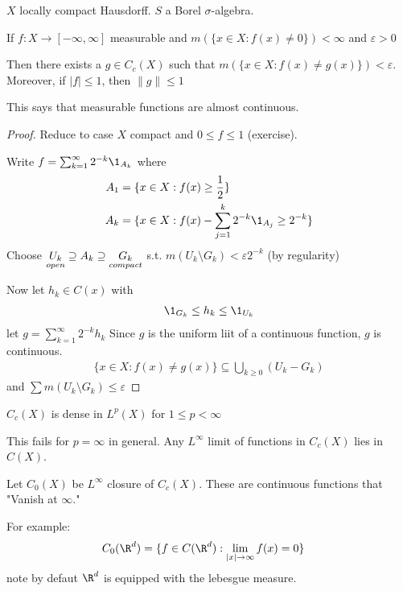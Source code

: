 $X$ locally compact Hausdorff. $S$ a Borel $\sigma$-algebra.

 
 \begin{theorem}[Lusin]
	 If $f: X \to [-\infty, \infty]$  measurable and $m(\{x \in X : f(x) \neq 0 \} ) < \infty$ and  $\varepsilon > 0$

	 Then there exists a $g \in C_{c} (X) $ such that $m( \{ x \in X : f(x) \neq g(x) \} ) < \varepsilon$.
	 Moreover, if $|f| \leq 1$, then $ \|g\| \leq 1$
 \end{theorem}
 
 \begin{remark}
 	This says that measurable functions are almost continuous.
 \end{remark}
 
\begin{proof}
	Reduce to case $X$ compact and $0 \leq f \leq 1$ (exercise).

	Write $f = \sum_{k=1}^{\infty} 2^{-k} \1_{A_{k}}$ where 
	\begin{align*}
		A_{1} &= \{ x \in X : f(x) \geq \frac{1}{2} \} \\
		A_{k} &= \{ x \in X : f(x) - \sum_{j=1}^{k} 2^{-k} \1_{A_{j}} \geq 2^{-k} \}
	\end{align*}
	Choose $\underset{open}{U_{k}} \supseteq A_{k} \supseteq \underset{compact}{G_{k}}$
	s.t. $m(U_{k} \setminus G_{k}) < \varepsilon 2^{-k}$ (by regularity)

	Now let $h_{k} \in C (x)$ with
	\begin{align*}
		\1_{G_{k}} \leq h_{k} \leq \1_{U_{k}}
	\end{align*} 
	let $g = \sum_{k=1}^{\infty} 2^{-k}h_{k}$
	Since $g$ is the uniform liit of a continuous function, $g$ is continuous.
	\begin{align*}
		\{ x \in X : f(x) \neq g(x) \} \subseteq \bigcup_{k \geq 0} ( U_{k} - G_{k} )
	\end{align*} and
	$\sum m( U_{k} \setminus G_{k} ) \leq \varepsilon$
\end{proof}
 
\begin{corollary}
	$C_c (X)$ is dense in $L^{p} (X)$ for $1 \leq p < \infty$
\end{corollary}

\begin{remark}
	This fails for $p = \infty$ in general.
	Any $L^{\infty}$ limit of functions in $C_c (X)$ lies in $C (X)$.
\end{remark}

Let $C_{0} (X)$ be $L^{\infty}$ closure of $C_c (X)$. These are continuous functions that "Vanish at $\infty$."

For example:
\begin{align*}
	C_{0} (\R^d ) &= \{ f\in C (\R^{d}) : \lim_{|x| \to \infty } f(x) = 0 \}
\end{align*} note by defaut $\R^{d}$ is equipped with the lebesgue measure.
